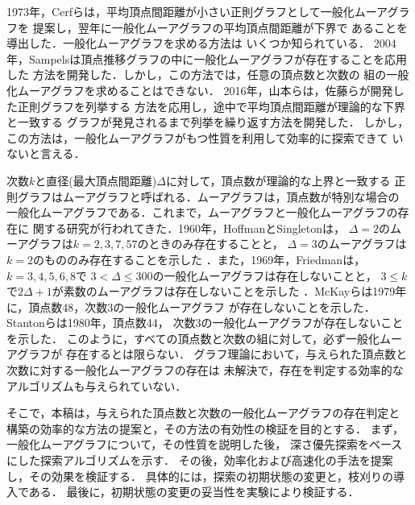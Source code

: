 1973年，Cerfらは，平均頂点間距離が小さい正則グラフとして一般化ムーアグラフを
提案し\cite{Cerf1973}，翌年に一般化ムーアグラフの平均頂点間距離が下界で
あることを導出した\cite{Cerf1974Lower}．一般化ムーアグラフを求める方法は
いくつか知られている．
2004年，Sampelsは頂点推移グラフの中に一般化ムーアグラフが存在することを応用した
方法を開発した\cite{Sampels2004}．しかし，この方法では，任意の頂点数と次数の
組の一般化ムーアグラフを求めることはできない．
2016年，山本らは，佐藤らが開発した正則グラフを列挙する
方法\cite{Sato2008}を応用し，途中で平均頂点間距離が理論的な下界と一致する
グラフが発見されるまで列挙を繰り返す方法を開発した\cite{Yamamoto2016}．
しかし，この方法は，一般化ムーアグラフがもつ性質を利用して効率的に探索できて
いないと言える．

次数$k$と直径(最大頂点間距離)$\Delta$に対して，頂点数が理論的な上界と一致する
正則グラフはムーアグラフと呼ばれる．ムーアグラフは，頂点数が特別な場合の
一般化ムーアグラフである．これまで，ムーアグラフと一般化ムーアグラフの存在に
関する研究が行われてきた\cite{Miller2005}．1960年，HoffmanとSingletonは，
$\Delta=2$のムーアグラフは$k=2,3,7,57$のときのみ存在することと，
$\Delta=3$のムーアグラフは$k=2$のもののみ存在することを示した
\cite{Hoffman1960}．また，1969年，Friedmanは，$k=3,4,5,6,8$で
$3<\Delta\leq300$の一般化ムーアグラフは存在しないことと，
$3\leq k$で$2\Delta+1$が素数のムーアグラフは存在しないことを示した
\cite{Friedman1971}．McKayらは1979年に，頂点数48，次数3の一般化ムーアグラフ
が存在しないことを\cite{McKay1979}示した．Stantonらは1980年，頂点数44，
次数3の一般化ムーアグラフが存在しないことを示した\cite{Stanton1980}．
このように，すべての頂点数と次数の組に対して，必ず一般化ムーアグラフが
存在するとは限らない．
グラフ理論において，与えられた頂点数と次数に対する一般化ムーアグラフの存在は
未解決で，存在を判定する効率的なアルゴリズムも与えられていない．

そこで，本稿は，与えられた頂点数と次数の一般化ムーアグラフの存在判定と
構築の効率的な方法の提案と，その方法の有効性の検証を目的とする．
まず，一般化ムーアグラフについて，その性質を説明した後，
深さ優先探索をベースにした探索アルゴリズムを示す．
その後，効率化および高速化の手法を提案し，その効果を検証する．
具体的には，探索の初期状態の変更と，枝刈りの導入である．
最後に，初期状態の変更の妥当性を実験により検証する．
